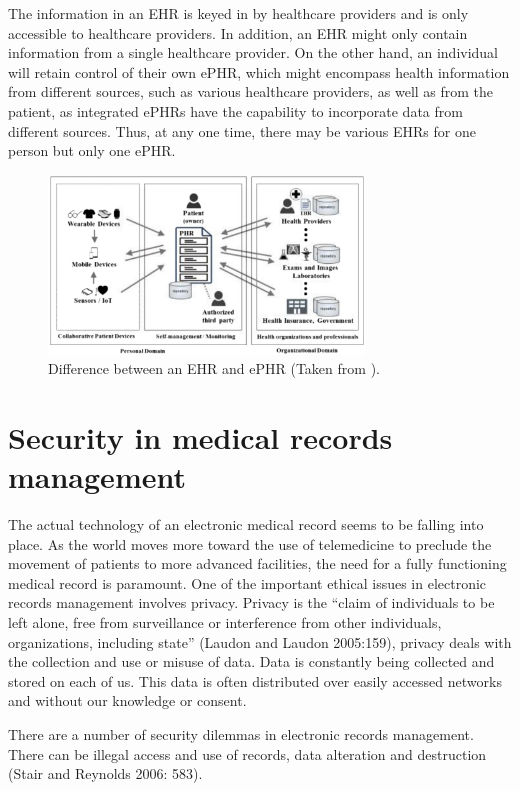 The information in an EHR is keyed in by healthcare providers and is only accessible to healthcare providers. In addition, an EHR might only contain information from a single healthcare provider. On the other hand, an individual will retain control of their own ePHR, which might encompass health information from different sources, such as various healthcare providers, as well as from the patient, as integrated ePHRs have the capability to incorporate data from different sources. Thus, at any one time, there may be various EHRs for one person but only one ePHR\cite{alsahafiOverviewElectronicPersonal2018}.
\begin{figure}[h!]
  \center
  \includegraphics[width=0.75\textwidth]{images/chapter1/phr_ehr.PNG}
  \caption{Difference between an EHR and ePHR (Taken from \cite{alsahafiOverviewElectronicPersonal2018}).}
  \label{fig:ehrvsphr}
\end{figure}
\newpage
\section{Security in medical records management}
The actual technology of an electronic medical record seems to be falling into place. As the world moves more toward the use of telemedicine to preclude the movement of patients to more advanced facilities, the need for a fully functioning medical record is paramount.
One of the important ethical issues in electronic records management involves privacy. Privacy is the “claim of individuals to be left alone, free from surveillance or interference from other individuals, organizations, including state” (Laudon and Laudon 2005:159), privacy deals with the collection and use or misuse of data. Data is constantly being collected and stored on each of us. This data is often distributed over easily accessed networks and without our knowledge or consent\cite{ngoepeSecurityPrivacyEthics2011}.
 
 
There are a number of security dilemmas in electronic records management. There can be illegal access and use of records, data alteration and destruction (Stair and Reynolds 2006: 583).

